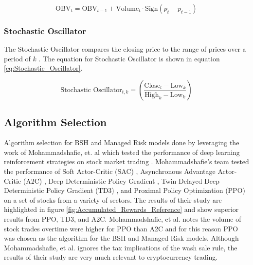 \documentclass[journal]{new-aiaa}
\begin{document}
\begin{equation}\label{eq:On_Balance_Volume}
        \text{OBV}_t = \text{OBV}_{t-1} + \text{Volume}_t \cdot \text{Sign}\left(p_{t} - p_{t-1}\right)
\end{equation}

\subsubsection{Stochastic Oscillator}\label{sec:Technical_Analysis:Stochastic_Oscillator}
The Stochastic Oscillator compares the closing price to the range of prices over a period of $k$ \cite{murphy1999technical}.
The equation for Stochastic Oscillator is shown in equation \ref{eq:Stochastic_Oscillator}.

\begin{equation}\label{eq:Stochastic_Oscillator}
        \text{Stochastic Oscillator}_{t,k} = \left(\frac{\text{Close}_{t} - \text{Low}_{k}}{\text{High}_{k} - \text{Low}_{k}}\right)
\end{equation}

\subsection{Algorithm Selection}\label{sec:Model_Design:Algorithm_Selection}
Algorithm selection for BSH and Managed Risk models done by leveraging the work of Mohammadshafie, et. al which tested the performance of deep learning reinforcement strategies on stock market trading \cite{RLinFinance}.
Mohammadshafie's team tested the performance of  Soft Actor-Critic (SAC) \cite{haarnoja2019softactorcriticalgorithmsapplications}, Asynchronous Advantage Actor-Critic (A2C) \cite{mnih2016asynchronousmethodsdeepreinforcement}, Deep Deterministic Policy Gradient \cite{lillicrap2019continuouscontroldeepreinforcement},
Twin Delayed Deep Deterministic Policy Gradient (TD3) \cite{fujimoto2018addressingfunctionapproximationerror}, and Proximal Policy Optimization (PPO) \cite{schulman2017proximalpolicyoptimizationalgorithms} on a set of stocks from a variety of sectors.
The results of their study are highlighted in figure \ref{fig:Accumulated_Rewards_Reference} and show superior results from PPO, TD3, and A2C.
Mohammadshafie, et al. notes the volume of stock trades overtime were higher for PPO than A2C and for this reason PPO was chosen as the algorithm for the BSH and Managed Risk models.
Although Mohammadshafie, et al. ignores the tax implications of the wash sale rule, the results of their study are very much relevant to cryptocurrency trading.
\end{document}

